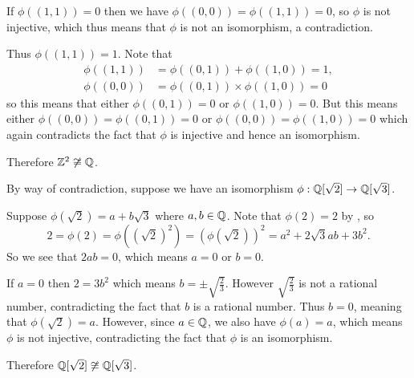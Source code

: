 \begin{questions}
    If $\phi((1,1)) = 0$ then we have $\phi((0,0)) = \phi((1,1)) = 0$, so $\phi$ is not injective, which thus means that $\phi$ is not an isomorphism, a contradiction.

    Thus $\phi((1,1)) = 1$. Note that
    \begin{align*}
        \phi((1,1)) &= \phi((0,1)) + \phi((1,0)) = 1,\\
        \phi((0,0)) &= \phi((0,1)) \times \phi((1,0)) = 0
    \end{align*}
    so this means that either $\phi((0,1)) = 0$ or $\phi((1,0)) = 0$. But this means either $\phi((0,0)) = \phi((0,1)) = 0$ or $\phi((0,0)) = \phi((1,0)) = 0$ which again contradicts the fact that $\phi$ is injective and hence an isomorphism.

    Therefore $\mathbb{Z}^2 \not\cong \mathbb{Q}$.

    \item By way of contradiction, suppose we have an isomorphism $\phi: \mathbb{Q}[\sqrt2] \to \mathbb{Q}[\sqrt3]$.

    Suppose $\phi(\sqrt2) = a + b\sqrt3$ where $a, b \in \mathbb{Q}$. Note that $\phi(2) = 2$ by , so
    \[
        2 = \phi(2) = \phi\left(\left(\sqrt2\right)^2\right) = \left(\phi(\sqrt2)\right)^2 = a^2 + 2\sqrt3ab + 3b^2.
    \]
    So we see that $2ab = 0$, which means $a = 0$ or $b = 0$.

    If $a = 0$ then $2 = 3b^2$ which means $b = \pm\sqrt{\frac23}$. However $\sqrt{\frac23}$ is not a rational number, contradicting the fact that $b$ is a rational number. Thus $b = 0$, meaning that $\phi(\sqrt2) = a$. However, since $a \in \mathbb{Q}$, we also have $\phi(a) = a$, which means $\phi$ is not injective, contradicting the fact that $\phi$ is an isomorphism.

    Therefore $\mathbb{Q}[\sqrt2] \not\cong \mathbb{Q}[\sqrt3]$.


\end{questions}
